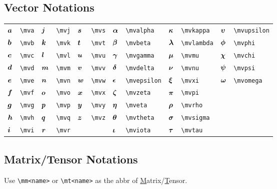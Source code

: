 \documentclass{article}
\begin{document}
\subsection{Vector Notations}
\begin{tabular}{*{12}{l}}
${\bm a}$ & \lstinline`\mva` & ${\bm j}$ & \lstinline`\mvj` & ${\bm s}$ & \lstinline`\mvs` & ${\bm \alpha}$ & \lstinline`\mvalpha` & ${\bm \kappa}$ & \lstinline`\mvkappa` & ${\bm \upsilon}$ & \lstinline`\mvupsilon`\\
${\bm b}$ & \lstinline`\mvb` & ${\bm k}$ & \lstinline`\mvk` & ${\bm t}$ & \lstinline`\mvt` & ${\bm \beta}$ & \lstinline`\mvbeta` & ${\bm \lambda}$ & \lstinline`\mvlambda` & ${\bm \phi}$ & \lstinline`\mvphi`\\
${\bm c}$ & \lstinline`\mvc` & ${\bm l}$ & \lstinline`\mvl` & ${\bm u}$ & \lstinline`\mvu` & ${\bm \gamma}$ & \lstinline`\mvgamma` & ${\bm \mu}$ & \lstinline`\mvmu` & ${\bm \chi}$ & \lstinline`\mvchi`\\
${\bm d}$ & \lstinline`\mvd` & ${\bm m}$ & \lstinline`\mvm` & ${\bm v}$ & \lstinline`\mvv` & ${\bm \delta}$ & \lstinline`\mvdelta` & ${\bm \nu}$ & \lstinline`\mvnu` & ${\bm \psi}$ & \lstinline`\mvpsi`\\
${\bm e}$ & \lstinline`\mve` & ${\bm n}$ & \lstinline`\mvn` & ${\bm w}$ & \lstinline`\mvw` & ${\bm \epsilon}$ & \lstinline`\mvepsilon` & ${\bm \xi}$ & \lstinline`\mvxi` & ${\bm \omega}$ & \lstinline`\mvomega`\\
${\bm f}$ & \lstinline`\mvf` & ${\bm o}$ & \lstinline`\mvo` & ${\bm x}$ & \lstinline`\mvx` & ${\bm \zeta}$ & \lstinline`\mvzeta` & ${\bm \pi}$ & \lstinline`\mvpi` & \\
${\bm g}$ & \lstinline`\mvg` & ${\bm p}$ & \lstinline`\mvp` & ${\bm y}$ & \lstinline`\mvy` & ${\bm \eta}$ & \lstinline`\mveta` & ${\bm \rho}$ & \lstinline`\mvrho` & \\
${\bm h}$ & \lstinline`\mvh` & ${\bm q}$ & \lstinline`\mvq` & ${\bm z}$ & \lstinline`\mvz` & ${\bm \theta}$ & \lstinline`\mvtheta` & ${\bm \sigma}$ & \lstinline`\mvsigma` & \\
${\bm i}$ & \lstinline`\mvi` & ${\bm r}$ & \lstinline`\mvr` &  &  & ${\bm \iota}$ & \lstinline`\mviota` & ${\bm \tau}$ & \lstinline`\mvtau` & \\
\end{tabular}

\subsection{Matrix/Tensor Notations}

Use \lstinline`\mm<name>` or \lstinline`\mt<name>` as the abbr of \underline{M}atrix/\underline{T}ensor.
\end{document}
